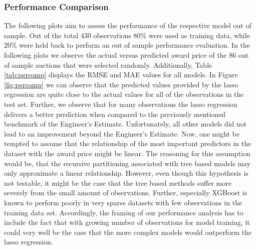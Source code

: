 \documentclass[a4paper,12pt, headsepline]{scrartcl}
\numberwithin{equation}{section}
\begin{document}
\subsubsection{Performance Comparison}
The following plots aim to assess the performance of the respective model out of sample. Out of the total 430 observations 80\% were used as training data, while 20\% were held back to perform an out of sample performance evaluation. In the following plots we observe the actual versus predicted award price of the 86 out of sample auctions that were selected randomly. Additionally, Table \ref{tab:percomp} displays the RMSE and MAE values for all models. In Figure \ref{fig:percomp} we can observe that the predicted values provided by the lasso regression are quite close to the actual values for all of the observations in the test set. Further, we observe that for many observations the lasso regression delivers a better prediction when compared to the previously mentioned benchmark of the Engineer's Estimate. Unfortunately, all other models did not lead to an improvement beyond the Engineer's Estimate. Now, one might be tempted to assume that the relationship of the most important predictors in the dataset with the award price might be linear. The reasoning for this assumption would be, that the recursive partitioning associated with tree based models may only approximate a linear relationship. However, even though this hypothesis is not testable, it might be the case that the tree based methods suffer more severely from the small amount of observations. Further, especially XGBoost is known to perform poorly in very sparse datasets with few observations in the training data set. Accordingly, the framing of our performance analysis has to include the fact that with growing number of observations for model training, it could very well be the case that the more complex models would outperform the lasso regression. 
\end{document}
